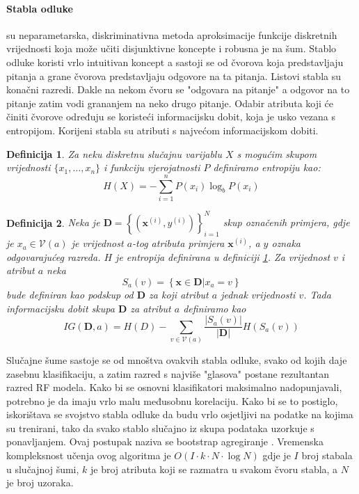 \documentclass[times, utf8, diplomski]{fer}
\newtheorem{definition}{Definicija}         %
\begin{document}
\paragraph{Stabla odluke}
su neparametarska, diskriminativna metoda aproksimacije funkcije diskretnih vrijednosti koja može učiti disjunktivne koncepte i robusna je na šum. Stablo odluke koristi vrlo intuitivan koncept a sastoji se od čvorova koja predstavljaju pitanja a grane čvorova predstavljaju odgovore na ta pitanja. Listovi stabla su konačni razredi. Dakle na nekom čvoru se "odgovara na pitanje" a odgovor na to pitanje zatim vodi grananjem na neko drugo pitanje. Odabir atributa koji će činiti čvorove određuju se koristeći informacijsku dobit, koja je usko vezana s entropijom. Korijeni stabla su atributi s najvećom informacijskom dobiti.
\begin{definition}
    Za neku diskretnu slučajnu varijablu $X$ s mogućim skupom vrijednosti $\{x_1, \dots, x_n\}$ i funkciju vjerojatnosti $P$ definiramo entropiju kao:
    \begin{equation}
        H(X) = - \sum_{i=1}^n P(x_i) \log_b P(x_i)
    \end{equation}
    \label{def:entropy}
\end{definition}

\begin{definition}
    Neka je  $\bm{D} = \left\{ (\bm{x}^{(i)}, y^{(i)}) \right\}_{i=1}^N$ skup označenih primjera, gdje je $x_a \in \mathcal{V}(a)$ je vrijednost $a$-tog atributa primjera $\bm{x}^{(i)}$, a $y$ oznaka odgovarajućeg razreda. $H$ je entropija definirana u definiciji  \ref{def:entropy}. Za vrijednost $v$ i atribut $a$ neka
    \begin{equation}
        S_a(v) = \left\{ \bm{x} \in \bm{D} \vert x_a = v \right\}
    \end{equation}
    bude definiran kao podskup od $\bm{D}$ za koji atribut $a$ jednak vrijednosti $v$. Tada informacijsku dobit  skupa $\bm{D}$ za atribut $a$ definiramo kao
    \begin{equation}
        IG(\bm{D}, a) = H(D) - \sum_{v\in \mathcal{V}(a)}
        \frac{\vert S_a(v) \vert}{\vert \bm{D} \vert} H(S_a(v))
    \end{equation}
\end{definition}


Slučajne šume sastoje se od mnoštva ovakvih stabla odluke, svako od kojih daje zasebnu klasifikaciju, a zatim razred s najviše "glasova" postane rezultantan razred RF modela. Kako bi se osnovni klasifikatori maksimalno nadopunjavali, potrebno je da imaju vrlo malu međusobnu korelaciju. Kako bi se to postiglo, iskorištava se svojstvo stabla odluke da budu vrlo osjetljivi na podatke na kojima su trenirani, tako da svako stablo slučajno iz skupa podataka uzorkuje s ponavljanjem. Ovaj postupak naziva se bootstrap agregiranje . Vremenska kompleksnost učenja ovog algoritma je $O(I \cdot k \cdot N \cdot \log N)$ gdje je $I$ broj stabala u slučajnoj šumi, $k$ je broj atributa koji se razmatra u svakom čvoru stabla, a $N$ je broj uzoraka.
\end{document}
